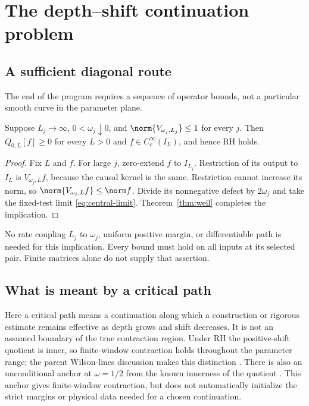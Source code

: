 \section{The depth--shift continuation problem}\label{sec:path}

\subsection{A sufficient diagonal route}

The end of the program requires a sequence of operator bounds,
not a particular smooth curve in the parameter plane.

\begin{proposition}\label{prop:diagonal}
Suppose $L_j\to\infty$, $0<\omega_j\downarrow0$, and
$\norm{V_{\omega_j,L_j}}\leq1$ for every $j$.
Then $Q_{0,L}[f]\geq0$ for every $L>0$ and
$f\in C_c^\infty(I_L)$, and hence RH holds.
\end{proposition}
\begin{proof}
Fix $L$ and $f$. For large $j$, zero-extend $f$ to $I_{L_j}$.
Restriction of its output to $I_L$ is $V_{\omega_j,L}f$,
because the causal kernel is the same. Restriction cannot
increase its norm, so
$\norm{V_{\omega_j,L}f}\leq\norm f$.
Divide its nonnegative defect by $2\omega_j$ and take the fixed-test
limit \eqref{eq:central-limit}. Theorem~\ref{thm:weil} completes
the implication.
\end{proof}

No rate coupling $L_j$ to $\omega_j$, uniform positive margin,
or differentiable path is needed for this implication. Every
bound must hold on all inputs at its selected pair.
Finite matrices alone do not supply that assertion.

\subsection{What is meant by a critical path}

Here a critical path means a continuation along which a
construction or rigorous estimate remains effective as depth grows
and shift decreases. It is not an assumed boundary of the true
contraction region. Under RH the positive-shift quotient is inner,
so finite-window contraction holds throughout the parameter range;
the parent Wilson-lines discussion makes this distinction
\cite{ParentWilson}. There is also an unconditional anchor at
$\omega=1/2$ from the known innerness of the quotient
\cite[Section~1.4]{Suzuki2012}. This anchor gives finite-window
contraction, but does not automatically initialize the strict
margins or physical data needed for a chosen continuation.


